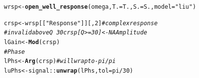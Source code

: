 \documentclass[10pt]{article}\usepackage[]{graphicx}\usepackage[]{color}
\makeatletter
\newcommand{\hlnum}[1]{\textcolor[rgb]{0.686,0.059,0.569}{#1}}%
\newcommand{\hlstr}[1]{\textcolor[rgb]{0.192,0.494,0.8}{#1}}%
\newcommand{\hlcom}[1]{\textcolor[rgb]{0.678,0.584,0.686}{\textit{#1}}}%
\newcommand{\hlopt}[1]{\textcolor[rgb]{0,0,0}{#1}}%
\newcommand{\hlstd}[1]{\textcolor[rgb]{0.345,0.345,0.345}{#1}}%
\newcommand{\hlkwb}[1]{\textcolor[rgb]{0.69,0.353,0.396}{#1}}%
\newcommand{\hlkwc}[1]{\textcolor[rgb]{0.333,0.667,0.333}{#1}}%
\newcommand{\hlkwd}[1]{\textcolor[rgb]{0.737,0.353,0.396}{\textbf{#1}}}%
\newenvironment{kframe}{%
 \def\at@end@of@kframe{}%
 \ifinner\ifhmode%
  \def\at@end@of@kframe{\end{minipage}}%
  \begin{minipage}{\columnwidth}%
 \fi\fi%
 \def\FrameCommand##1{\hskip\@totalleftmargin \hskip-\fboxsep
 \colorbox{shadecolor}{##1}\hskip-\fboxsep
     \hskip-\linewidth \hskip-\@totalleftmargin \hskip\columnwidth}%
 \MakeFramed {\advance\hsize-\width
   \@totalleftmargin\z@ \linewidth\hsize
   \@setminipage}}%
 {\par\unskip\endMakeFramed%
 \at@end@of@kframe}
\newenvironment{knitrout}{}{} %
\makeatother
\begin{document}
\begin{knitrout}
\color{fgcolor}\begin{kframe}
\begin{alltt}
\hlstd{wrsp} \hlkwb{<-} \hlkwd{open_well_response}\hlstd{(omega,} \hlkwc{T.} \hlstd{= T.,} \hlkwc{S.} \hlstd{= S.,} \hlkwc{model} \hlstd{=} \hlstr{"liu"}\hlstd{)}
\end{alltt}


{\ttfamily\noindent\color{warningcolor}{\#\# Warning: water column height 'Hw' not given. using default\\\#\# Warning: aquifer thickness 'Ta' not given. using default\\\#\# Warning: this model has not yet been verified.}}\begin{alltt}
\hlstd{crsp} \hlkwb{<-} \hlstd{wrsp[[}\hlstr{"Response"}\hlstd{]][,} \hlnum{2}\hlstd{]}  \hlcom{# complex response}
\hlcom{# invalid above Q ~ 30 crsp[Q>=30] <- NA Amplitude}
\hlstd{lGain} \hlkwb{<-} \hlkwd{Mod}\hlstd{(crsp)}
\hlcom{# Phase}
\hlstd{lPhs} \hlkwb{<-} \hlkwd{Arg}\hlstd{(crsp)}  \hlcom{# will wrap to -pi/pi}
\hlstd{luPhs} \hlkwb{<-} \hlstd{signal::}\hlkwd{unwrap}\hlstd{(lPhs,} \hlkwc{tol} \hlstd{= pi}\hlopt{/}\hlnum{30}\hlstd{)}
\end{alltt}
\end{kframe}
\end{knitrout}
\end{document}
